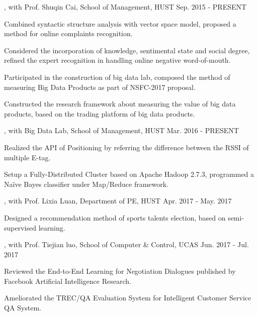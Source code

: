 \vspace{-2.0mm}

\begin{cventries}
\vspace{-1.5mm}

\cvexperience
{, with Prof. Shuqin Cai, School of Management, HUST}
{Sep. 2015 - PRESENT}
{
    \begin{cvitems}
    \item {Combined syntactic structure analysis with vector space model, proposed a method for online complaints recognition.}
    \item {Considered the incorporation of knowledge, sentimental state and social degree, refined the expert recognition in handling online negative word-of-mouth.}
    \item {Participated in the construction of big data lab, composed the method of measuring Big Data Products as part of NSFC-2017 proposal.}
    \item {Constructed the research framework about measuring the value of big data products, based on the trading platform of big data products.}
    \end{cvitems}
}

\cvexperience
{, with Big Data Lab, School of Management, HUST}
{Mar. 2016 - PRESENT}
{
    \begin{cvitems}
    \item {Realized the API of Positioning by referring the difference between the RSSI of multiple E-tag.}
    \item {Setup a Fully-Distributed Cluster based on Apache Hadoop 2.7.3, programmed a Naïve Bayes classifier under Map/Reduce framework.}
    \end{cvitems}
}

\cvexperience
{, with Prof. Lixia Luan, Department of PE, HUST}
{Apr. 2017 - May. 2017}
{
    \begin{cvitems}
    \item {Designed a recommendation method of sports talents election, based on semi-supervised learning.}
    \end{cvitems}
}

\cvexperience
{, with Prof. Tiejian luo, School of Computer \& Control, UCAS}
{Jun. 2017 - Jul. 2017}
{
    \begin{cvitems}
    \item {Reviewed the End-to-End Learning for Negotiation Dialogues published by Facebook Artificial Intelligence Research.}
    \item {Ameliorated the TREC/QA Evaluation System for Intelligent Customer Service QA System.}
    \end{cvitems}
}


\end{cventries}
